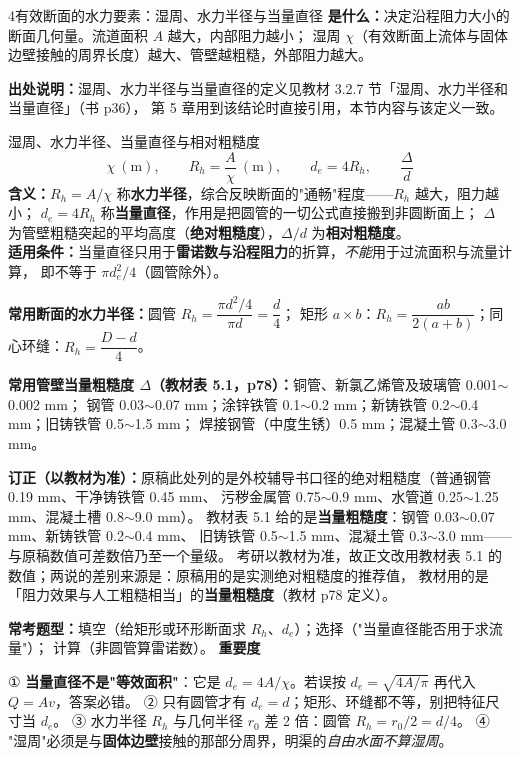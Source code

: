 \begin{kaodian}{4}{有效断面的水力要素：湿周、水力半径与当量直径}
\textbf{是什么：}决定沿程阻力大小的断面几何量。流道面积 $A$ 越大，内部阻力越小；
湿周 $\chi$（有效断面上流体与固体边壁接触的周界长度）越大、管壁越粗糙，外部阻力越大。

\noindent\textbf{出处说明：}湿周、水力半径与当量直径的定义见教材 3.2.7 节「湿周、水力半径和当量直径」（书 p36），
第 5 章用到该结论时直接引用，本节内容与该定义一致。

\begin{gongshi}{湿周、水力半径、当量直径与相对粗糙度}
\[ \chi\ (\mathrm{m}),\qquad R_h=\frac{A}{\chi}\ (\mathrm{m}),\qquad d_e=4R_h,\qquad \frac{\Delta}{d} \]
\textbf{含义：}$R_h=A/\chi$ 称\textbf{水力半径}，综合反映断面的"通畅"程度——$R_h$ 越大，阻力越小；
$d_e=4R_h$ 称\textbf{当量直径}，作用是把圆管的一切公式直接搬到非圆断面上；
$\Delta$ 为管壁粗糙突起的平均高度（\textbf{绝对粗糙度}），$\Delta/d$ 为\textbf{相对粗糙度}。\\
\textbf{适用条件：}当量直径只用于\textbf{雷诺数与沿程阻力}的折算，\emph{不能}用于过流面积与流量计算，
即不等于 $\pi d_e^2/4$（圆管除外）。
\end{gongshi}

\textbf{常用断面的水力半径：}圆管 $R_h=\dfrac{\pi d^2/4}{\pi d}=\dfrac{d}{4}$；
矩形 $a\times b$：$R_h=\dfrac{ab}{2(a+b)}$；同心环缝：$R_h=\dfrac{D-d}{4}$。

\textbf{常用管壁当量粗糙度 $\Delta$（教材表 5.1，p78）：}铜管、新氯乙烯管及玻璃管 0.001$\sim$0.002 mm；
钢管 0.03$\sim$0.07 mm；涂锌铁管 0.1$\sim$0.2 mm；新铸铁管 0.2$\sim$0.4 mm；旧铸铁管 0.5$\sim$1.5 mm；
焊接钢管（中度生锈）0.5 mm；混凝土管 0.3$\sim$3.0 mm。

\begin{tishi}
\textbf{订正（以教材为准）：}原稿此处列的是外校辅导书口径的绝对粗糙度（普通钢管 0.19 mm、干净铸铁管 0.45 mm、
污秽金属管 0.75$\sim$0.9 mm、水管道 0.25$\sim$1.25 mm、混凝土槽 0.8$\sim$9.0 mm）。
教材表 5.1 给的是\textbf{当量粗糙度}：钢管 0.03$\sim$0.07 mm、新铸铁管 0.2$\sim$0.4 mm、
旧铸铁管 0.5$\sim$1.5 mm、混凝土管 0.3$\sim$3.0 mm——与原稿数值可差数倍乃至一个量级。
考研以教材为准，故正文改用教材表 5.1 的数值；两说的差别来源是：原稿用的是实测绝对粗糙度的推荐值，
教材用的是「阻力效果与人工粗糙相当」的\textbf{当量粗糙度}（教材 p78 定义）。
\end{tishi}

\textbf{常考题型：}填空（给矩形或环形断面求 $R_h$、$d_e$）；选择（"当量直径能否用于求流量"）；
计算（非圆管算雷诺数）。
\textbf{重要度 }\quad{}\quad{}

\begin{yicuo}
① \textbf{当量直径不是"等效面积"}：它是 $d_e=4A/\chi$。若误按 $d_e=\sqrt{4A/\pi}$ 再代入 $Q=Av$，答案必错。
② 只有圆管才有 $d_e=d$；矩形、环缝都不等，别把特征尺寸当 $d_e$。
③ 水力半径 $R_h$ 与几何半径 $r_0$ 差 2 倍：圆管 $R_h=r_0/2=d/4$。
④ "湿周"必须是与\textbf{固体边壁}接触的那部分周界，明渠的\emph{自由水面不算湿周}。
\end{yicuo}
\end{kaodian}


